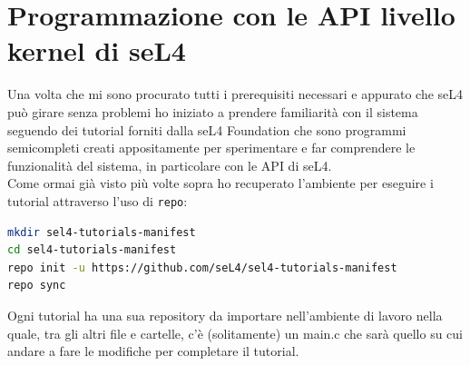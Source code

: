 \section{Programmazione con le API livello kernel di seL4}
Una volta che mi sono procurato tutti i prerequisiti necessari e appurato che seL4 può girare senza problemi ho iniziato a prendere familiarità con il sistema seguendo dei tutorial forniti dalla seL4 Foundation che sono programmi semicompleti creati appositamente per sperimentare e far comprendere le funzionalità del sistema, in particolare con le API di seL4. \cite{sel4API}\\
Come ormai già visto più volte sopra ho recuperato l'ambiente per eseguire i tutorial attraverso l'uso di \texttt{repo}:
\begin{lstlisting}[language=bash]
mkdir sel4-tutorials-manifest
cd sel4-tutorials-manifest
repo init -u https://github.com/seL4/sel4-tutorials-manifest
repo sync
\end{lstlisting}
Ogni tutorial ha una sua repository da importare nell'ambiente di lavoro nella quale, tra gli altri file e cartelle, c'è (solitamente) un main.c che sarà quello su cui andare a fare le modifiche per completare il tutorial.


